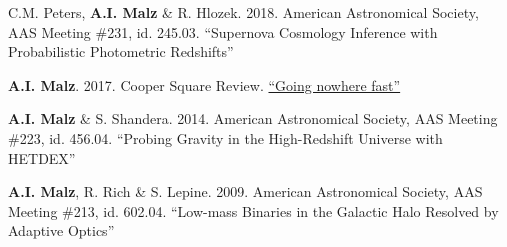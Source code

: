 \begin{list}{}{\malzlist}
	
	\item C.M. Peters, {\bf A.I. Malz} \& R. Hlozek. 2018. American Astronomical Society, AAS Meeting \#231, id. 245.03. ``Supernova Cosmology Inference with Probabilistic Photometric Redshifts''

	\item {\bf A.I. Malz}. 2017. Cooper Square Review. \href{http://coopersquarereview.org/post/going-nowhere-fast/}{``Going nowhere fast''}
	
	\item {\bf A.I. Malz} \& S. Shandera. 2014. American Astronomical Society, AAS Meeting \#223, id. 456.04. ``Probing Gravity in the High-Redshift Universe with HETDEX''
	
	\item {\bf A.I. Malz}, R. Rich \& S. Lepine. 2009. American Astronomical Society, AAS Meeting \#213, id. 602.04. ``Low-mass Binaries in the Galactic Halo Resolved by Adaptive Optics''
\end{list}
